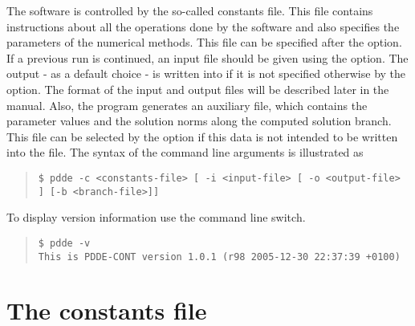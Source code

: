 \documentclass[10pt,a4paper]{ddedoc}
\begin{document}
The software is controlled by the so-called constants file. This file contains
instructions about all the operations done by the software and also specifies the parameters of the numerical methods.
This file can be specified after the  option. If a previous run is continued, an input file should be given using the  option. The output - as a default choice - is written into  if it is not specified otherwise by the  option. The format of the input and output files will be described later in the manual. Also, the program generates an auxiliary file, which contains the parameter values and the solution norms along the computed solution branch.
This file can be selected by the  option if this data is not intended to be written into the  file. The syntax of the command line arguments is illustrated as
{ \small \begin{quote} \begin{lstlisting}[basicstyle=\tt,frame=single]
$ pdde -c <constants-file> [ -i <input-file> [ -o <output-file> ] [-b <branch-file>]]
\end{lstlisting} \end{quote} } \noindent
To display version information use the  command line switch.
{ \small \begin{quote} \begin{lstlisting}[basicstyle=\tt,frame=single]
$ pdde -v
This is PDDE-CONT version 1.0.1 (r98 2005-12-30 22:37:39 +0100)
\end{lstlisting} \end{quote} } \noindent


\section{The constants file}
\label{constfile}
\end{document}
